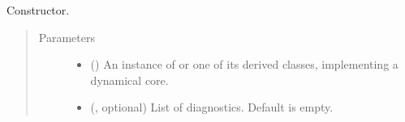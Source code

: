 \documentclass[letterpaper,10pt,english]{sphinxmanual}
\begin{document}
\begin{fulllineitems}
\begin{fulllineitems}
\begin{quote}
\begin{description}
\begin{itemize}
\end{itemize}


\end{description}\end{quote}

\end{fulllineitems}


\begin{fulllineitems}
\label{\detokenize{api:model.Model.__init__}}
Constructor.
\begin{quote}\begin{description}
\item[{Parameters}] \leavevmode\begin{itemize}
\item {} 
 () \textendash{} An instance of {\hyperref[\detokenize{api:dycore.dycore.DynamicalCore}]{}} or one of its derived classes, implementing a dynamical core.

\item {} 
 (, optional) \textendash{} List of diagnostics. Default is empty.

\end{itemize}

\end{description}\end{quote}

\end{fulllineitems}


\end{fulllineitems}
\end{document}

